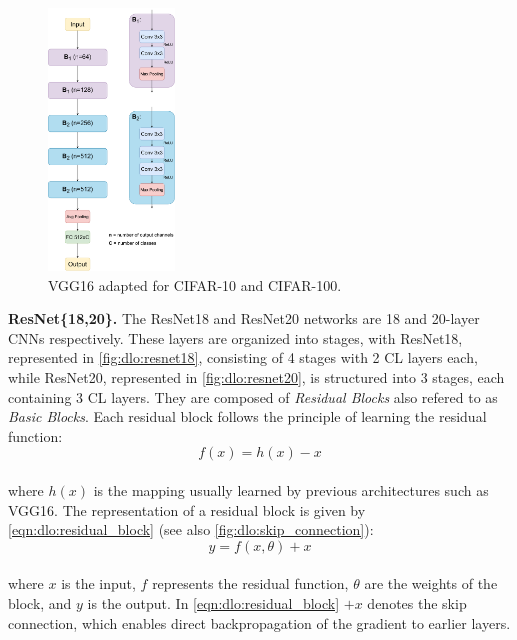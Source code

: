 \begin{figure}[htbp]
  \centering
  \includegraphics[width=0.30\textwidth]{chapter_dlo/assets/vgg16_cifar.pdf}
  \caption{VGG16 adapted for CIFAR-10 and CIFAR-100.}
  \label{fig:dlo:vgg16_cifar}
\end{figure}

\noindent \textbf{ResNet\{18,20\}.} The ResNet18 and ResNet20 networks
\cite{DBLP:conf/cvpr/HeZRS16} are 18 and 20-layer \acp{CNN} respectively. These
layers are organized into stages, with ResNet18, represented in
\cref{fig:dlo:resnet18}, consisting of 4 stages with 2 \ac{CL} layers
each, while ResNet20, represented in \cref{fig:dlo:resnet20}, is structured into
3 stages, each containing 3 \ac{CL} layers. They are composed of
\emph{Residual Blocks} also refered to as \emph{Basic Blocks}. Each residual
block follows the principle of learning the residual function:\\

\begin{equation}
  f(x) = h(x) - x
\end{equation} \\

\noindent where $h(x)$ is the mapping usually learned by previous architectures
such as VGG16. The representation of a residual block is given by
\cref{eqn:dlo:residual_block} (see also \cref{fig:dlo:skip_connection}): \\

\begin{equation}
  \label{eqn:dlo:residual_block}
  y = f(x,\theta) + x
\end{equation}\\

\noindent where $x$ is the input, $f$ represents the residual function, $\theta$
are the weights of the block, and $y$ is the output. In
\cref{eqn:dlo:residual_block} $+ x$ denotes the skip connection, which enables
direct backpropagation of the gradient to earlier layers.\\

